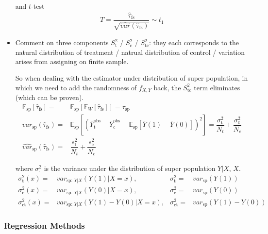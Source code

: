 \begin{itemize}[topsep=2pt,itemsep=0pt]
    and $ t $-test
    \begin{align}
        T=\dfrac{\hat{\tau}_\mathrm{fs}    }{\sqrt{\hat{var}(\hat{\tau}_\mathrm{fs} )}} \sim t_1
    \end{align}
    \item Comment on three components $ S^2_\mathrm{t}$ / $S^2_{\mathrm{c} }$ / $S^2_{\mathrm{tc} }  $: they each corresponds to the natural distribution of treatment / natrual distribution of control / variation arises from assigning on finite sample.
    
    So when dealing with the estimator under distribution of super population, in which we need to add the randomness of $ f_{X,Y} $ back, the $ S^2_\mathrm{tc}  $ term eliminates (which can be proven).
    \begin{align}
        \mathbb{E}_\mathrm{sp} \left[ \hat{\tau}_\mathrm{fs}  \right] = & \mathbb{E}_\mathrm{sp} \left[ \mathbb{E}_W \left[ \hat{\tau}_\mathrm{fs}  \right] \right] = \tau_\mathrm{sp}  \\
        var_\mathrm{sp} (\hat{\tau}_\mathrm{fs} )=&\mathbb{E}_\mathrm{sp} \left[( \bar{Y}_\mathrm{t} ^\mathrm{obs}-\bar{Y}_\mathrm{c}^\mathrm{obs}-\mathbb{E}_\mathrm{sp} \left[ \bar{Y}(1)-\bar{Y}(0) \right]    )^2 \right] = \dfrac{\sigma _\mathrm{t}^2 }{N_t}+\dfrac{\sigma _\mathrm{c}^2 }{N_c}\\
        \hat{var}_\mathrm{sp}(\hat{\tau}_\mathrm{fs} )=&\dfrac{s_\mathrm{t}^2 }{N_t}+\dfrac{s_\mathrm{c}^2 }{N_c} 
    \end{align}

    where $ \sigma ^2_\cdot $ is the variance under the distribution of super population $ Y|X $, $ X $.
    \begin{align}
         \sigma _\mathrm{t}^2(x)=&var_{\mathrm{sp}:\,Y|X}\left(Y(1)|X=x\right) ,& \sigma _\mathrm{t}^2=&var_\mathrm{sp}\left(Y(1)\right)\\
         \sigma _\mathrm{c}^2(x)=&var_{\mathrm{sp}:\,Y|X}\left(Y(0)|X=x\right) ,& \sigma _\mathrm{c}^2=&var_\mathrm{sp}\left(Y(0)\right)\\
         \sigma _\mathrm{ct}^2(x)=&var_{\mathrm{sp}:\,Y|X}\left(Y(1)-Y(0)|X=x\right) ,& \sigma _\mathrm{ct}^2=&var_\mathrm{sp}\left(Y(1)-Y(0)\right)
    \end{align}
    
    

    
\end{itemize}


\subsubsection{Regression Methods}

